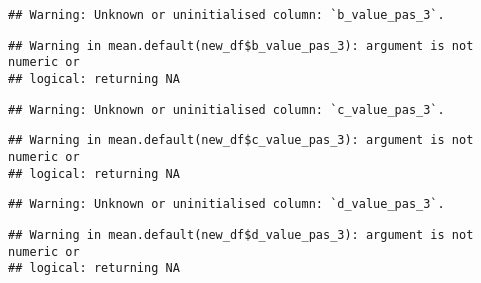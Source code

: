 \documentclass[
]{article}
\newenvironment{Shaded}{\begin{snugshade}}{\end{snugshade}}
\newcommand{\FunctionTok}[1]{\textcolor[rgb]{0.00,0.00,0.00}{#1}}
\newcommand{\NormalTok}[1]{#1}
\newcommand{\OtherTok}[1]{\textcolor[rgb]{0.56,0.35,0.01}{#1}}
\newcommand{\SpecialCharTok}[1]{\textcolor[rgb]{0.00,0.00,0.00}{#1}}
\begin{document}
\begin{verbatim}
## Warning: Unknown or uninitialised column: `b_value_pas_3`.
\end{verbatim}

\begin{verbatim}
## Warning in mean.default(new_df$b_value_pas_3): argument is not numeric or
## logical: returning NA
\end{verbatim}

\begin{Shaded}
\end{Shaded}

\begin{verbatim}
## Warning: Unknown or uninitialised column: `c_value_pas_3`.
\end{verbatim}

\begin{verbatim}
## Warning in mean.default(new_df$c_value_pas_3): argument is not numeric or
## logical: returning NA
\end{verbatim}

\begin{Shaded}
\end{Shaded}

\begin{verbatim}
## Warning: Unknown or uninitialised column: `d_value_pas_3`.
\end{verbatim}

\begin{verbatim}
## Warning in mean.default(new_df$d_value_pas_3): argument is not numeric or
## logical: returning NA
\end{verbatim}

\begin{Shaded}
\end{Shaded}
\end{document}

